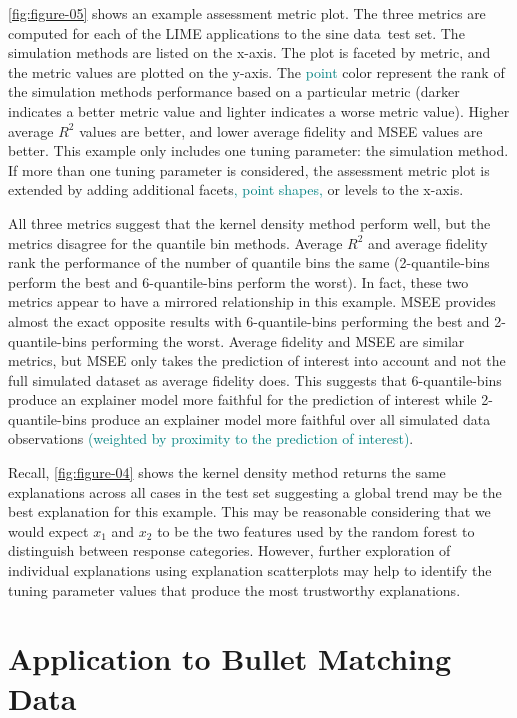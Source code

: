 \documentclass[AMS,STIX2COL]{WileyNJD-v2}\usepackage[]{graphicx}\usepackage[]{color}
\newcommand{\kge}[1]{\textcolor{teal}{#1}}
\newcommand{\data}{sine data}
\renewcommand{\sout}[1]{\unskip}
\begin{document}
\autoref{fig:figure-05} shows an example assessment metric plot. The three metrics are computed for each of the LIME applications to the \data \ test set. The simulation methods are listed on the x-axis. The plot is faceted by metric, and the metric values are plotted on the y-axis. The \kge{point} color\sout{s of the points} represent the rank of the simulation methods performance based on a particular metric (darker indicates a better metric value and lighter indicates a worse metric value). Higher average $R^2$ values are better, and lower average fidelity and MSEE values are better. This example only includes one tuning parameter: the simulation method. If more than one tuning parameter is considered, the assessment metric plot is extended by adding additional facets\kge{, point shapes,} or levels to the x-axis.

All three metrics suggest that the kernel density method perform\sout{ed} well, but the metrics disagree for the quantile bin\sout{s} methods. Average $R^2$ and average fidelity rank the performance of the number of quantile bins the same (2-quantile-bins perform the best and 6-quantile-bins perform the worst). In fact, these two metrics appear to have a mirrored relationship in this example. MSEE provides almost the exact opposite results with 6-quantile-bins performing the best and 2-quantile-bins performing the worst. Average fidelity and MSEE are similar metrics, but MSEE only takes the prediction of interest into account and not the full simulated dataset as average fidelity does. This suggests that 6-quantile-bins produce an explainer model more faithful for the prediction of interest while 2-quantile-bins produce an explainer model more faithful over all simulated data observations \kge{(weighted by proximity to the prediction of interest)}. 

Recall, \autoref{fig:figure-04} shows the kernel density method returns the same explanations across all cases in the test set suggesting a global trend may be the best explanation for this example. This may be reasonable considering that we would expect $x_1$ and $x_2$ to be  the two features used by the random forest to distinguish between response categories. However, further exploration of individual explanations using explanation scatterplots may help to identify the tuning parameter values that produce the most trustworthy explanations.

\section{Application to Bullet Matching Data} \label{application}
\end{document}
